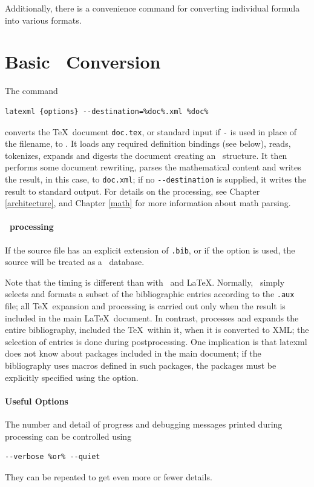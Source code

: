 \documentclass{book}
\newcommand{\shellcode}{\lstinline[style=shell]}
\begin{document}
Additionally, there is a convenience command 
for converting individual formula into various formats.

\section[Conversion]{Basic \XML\ Conversion}\label{usage.conversion}
The command
\begin{lstlisting}[style=shell]
latexml {options} --destination=%doc%.xml %doc%
\end{lstlisting}
converts the \TeX\ document \texttt{doc.tex},
or standard input if \texttt{-} is used in place of the filename, to \XML.
It loads any required definition bindings (see below),
reads, tokenizes, expands and digests the document creating an \XML\ structure.
It then performs some document rewriting, parses the mathematical content
and writes the result, in this case, to \texttt{doc.xml};
if no \shellcode|--destination| is supplied, it writes the result to standard output.
For details on the processing, see Chapter \ref{architecture},
and Chapter \ref{math} for more information about math parsing.

\paragraph{\BibTeX\ processing}
If the source file has an explicit extension of \texttt{.bib},
or if the  option is used, the source will be
treated as a \BibTeX\ database.

\begin{advanced}
Note that the timing is different than with \BibTeX\ and \LaTeX.
Normally, \BibTeX\ simply selects and formats a subset of the
bibliographic entries according to the \texttt{.aux} file;
all \TeX\ expansion and processing is carried out only when
the result is included in the main \LaTeX\ document.
In contrast,  processes and expands
the entire bibliography, included the \TeX\ within it, when it is converted to XML;
the selection of entries is done during postprocessing.
One implication is that latexml does not know about packages
included in the main document; if the bibliography uses
macros defined in such packages, the packages must be explicitly
specified using the  option.
\end{advanced}

\paragraph{Useful Options}
The number and detail of progress and debugging messages printed
during processing can be controlled using
\begin{lstlisting}[style=shell]
--verbose %or% --quiet
\end{lstlisting}
They can  be repeated to get even more or fewer details.
\end{document}
